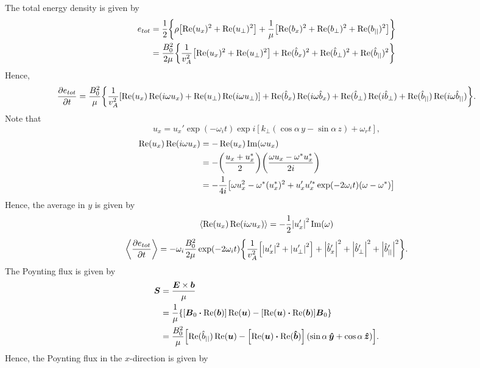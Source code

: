 \documentclass{article}
\let\vec\boldsymbol
\begin{document}
The total energy density is given by
\[\begin{aligned}
e_{tot} &= \frac{1}{2}\qty{\rho\qty[\Re(u_x)^2 + \Re(u_\perp)^2] + \frac{1}{\mu}\qty[\Re(b_x)^2 + \Re(b_\perp)^2 + \Re(b_{||})^2]} \\
&= \frac{B_0^2}{2\mu}\qty{\frac{1}{v_A^2}\qty[\Re(u_x)^2 + \Re(u_\perp)^2] + \Re(\hat{b}_x)^2 + \Re(\hat{b}_\perp)^2 + \Re(\hat{b}_{||})^2}
\end{aligned}\]
Hence,
\[\pdv{e_{tot}}{t}= \frac{B_0^2}{\mu}\qty{\frac{1}{v_A^2}\qty[\Re(u_x)\Re(i\omega u_x) + \Re(u_\perp)\Re(i\omega u_\perp)] + \Re(\hat{b}_x)\Re(i\omega\hat{b}_x) + \Re(\hat{b}_\perp)\Re(i\hat{b}_\perp) + \Re(\hat{b}_{||})\Re(i\omega\hat{b}_{||})}.\]
Note that
\[u_x = u_x'\exp(-\omega_i t)\exp{i[k_\perp(\cos\alpha\,y-\sin\alpha\,z)+\omega_r t]},\]
\[\begin{aligned}
\Re(u_x)\Re(i\omega u_x) &= -\Re(u_x)\Im(\omega u_x) \\
&= -\qty(\frac{u_x + u_x^*}{2})\qty(\frac{\omega u_x - \omega^* u_x^*}{2i}) \\
&= -\frac{1}{4i}\qty[\omega u_x^2 - \omega^* (u_x^*)^2 + u_x' u_x'^*\exp(-2\omega_i t)(\omega  - \omega^*)]
\end{aligned}\]
Hence, the average in $y$ is given by
\[\left\langle\Re(u_x)\Re(i\omega u_x)\right\rangle = -\frac{1}{2}\abs{u_x'}^2\Im(\omega)\]
\[\left\langle\pdv{e_{tot}}{t}\right\rangle = -\omega_i\frac{B_0^2}{2\mu}\exp(-2\omega_i t)\qty{\frac{1}{v_A^2}\qty[\abs{u_x'}^2 + \abs{u_\perp'}^2] + \abs{\hat{b}_x'}^2 + \abs{\hat{b}_\perp'}^2 + \abs{\hat{b}_{||}'}^2}.\]
The Poynting flux is given by
\[\begin{aligned}
    \vec{S}&=\frac{\vec{E}\times\vec{b}}{\mu} \\
    & = \frac{1}{\mu}\qty{\qty[\vec{B}_0\vdot\Re(\vec{b})]\Re(\vec{u})-\qty[\Re(\vec{u})\vdot\Re(\vec{b})
    ]\vec{B}_0} \\
    & = \frac{B_0^2}{\mu}\qty[\Re(\hat{b}_{||})\Re(\vec{u})-\qty[\Re(\vec{u})\vdot\Re(\vec{\hat{b}})](\sin\alpha \,\vec{\hat{y}} + \cos\alpha\,\vec{\hat{z}})].
\end{aligned}\]
Hence, the Poynting flux in the $x$-direction is given by
\end{document}
